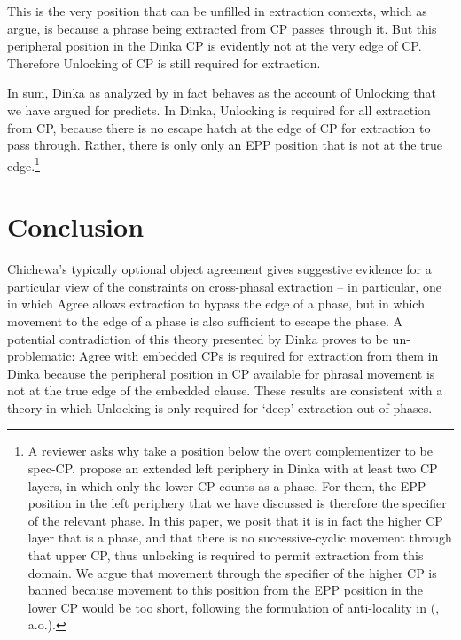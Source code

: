 \documentclass[output=paper,colorlinks,citecolor=brown]{langscibook}
\begin{document}
This is the very position that can be unfilled in extraction contexts, which as \citeauthor{VanUrkRichards2015} argue, is because a phrase being extracted from CP passes through it. But this peripheral position in the Dinka CP is evidently not at the very edge of CP. Therefore Unlocking of CP is still required for extraction.

In sum, Dinka as analyzed by \citeauthor{VanUrkRichards2015} in fact behaves as the account of Unlocking that we have argued for predicts. In Dinka, Unlocking is required for all extraction from CP, because there is no escape hatch at the edge of CP for extraction to pass through. Rather, there is only only an EPP position that is not at the true edge.\footnote{A reviewer asks why \citeauthor{VanUrkRichards2015} take a position below the overt complementizer to be spec-CP. \citeauthor{VanUrkRichards2015} propose an extended left periphery in Dinka with at least two CP layers, in which only the lower CP counts as a phase. For them, the EPP position in the left periphery that we have discussed is therefore the specifier of the relevant phase. In this paper, we posit that it is in fact the higher CP layer that is a phase, and that there is no successive-cyclic movement through that upper CP, thus unlocking is required to permit extraction from this domain. We argue that movement through the specifier of the higher CP is banned because movement to this position from the EPP position in the lower CP would be too short, following the formulation of anti-locality in \citeauthor{Erlewine2016} (\citeyear{Erlewine2016}, a.o.).}

\section{Conclusion}\label{sec:branan:6}

Chichewa's typically optional object agreement gives suggestive evidence for a particular view of the constraints on cross-phasal extraction -- in particular, one in which Agree allows extraction to bypass the edge of a phase, but in which movement to the edge of a phase is also sufficient to escape the phase. A potential contradiction of this theory presented by Dinka proves to be un-problematic: Agree with embedded CPs is required for extraction from them in Dinka because the peripheral position in CP available for phrasal movement is not at the true edge of the embedded clause. These results are consistent with a theory in which Unlocking is only required for `deep' extraction out of phases.
\end{document}
